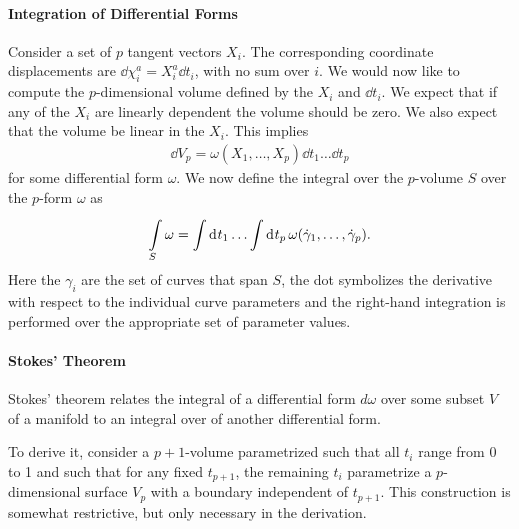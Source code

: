 \paragraph{Integration of Differential Forms}
Consider a set of $p$ tangent vectors $X_{i}$. The corresponding coordinate displacements are $\dd{\chi_{i}^{a}} = X_{i}^{a}\dd{t_{i}}$, with no sum over $i$. We would now like to compute the $p$-dimensional volume defined by the $X_{i}$ and $\dd{t_{i}}$. We expect that if any of the $X_{i}$ are linearly dependent the volume should be zero. We also expect that the volume be linear in the $X_{i}$. This implies
\begin{align*}
\dd{V_{p}} = \omega(X_{1}, \dots, X_{p})\dd{t_{1}}\dots\dd{t_{p}}
\end{align*}
for some differential form $\omega$. We now define the integral over the $p$-volume $S$ over the $p$-form $\omega$ as
\begin{align*}
\minteg{S}{\omega} = \integ{}{}{t_{1}}{\dots \integ{}{}{t_{p}}{\omega(\dot{\gamma}_{1},\dots, \dot{\gamma}_{p})}}.
\end{align*}
Here the $\gamma_{i}$ are the set of curves that span $S$, the dot symbolizes the derivative with respect to the individual curve parameters and the right-hand integration is performed over the appropriate set of parameter values.

\paragraph{Stokes' Theorem}
Stokes' theorem relates the integral of a differential form $d\omega$ over some subset $V$ of a manifold to an integral over  of another differential form.

To derive it, consider a $p + 1$-volume parametrized such that all $t_{i}$ range from 0 to 1 and such that for any fixed $t_{p + 1}$, the remaining $t_{i}$ parametrize a $p$-dimensional surface $V_{p}$ with a boundary independent of $t_{p + 1}$. This construction is somewhat restrictive, but only necessary in the derivation.

